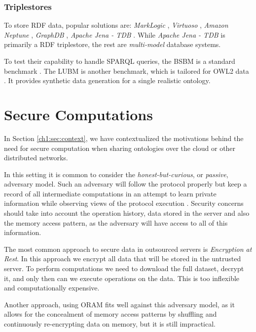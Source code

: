 \subsubsection{Triplestores} 

To store \gls{RDF} data, popular solutions are: \emph{MarkLogic} \autocite{MarkLogic2020-pb}, \emph{Virtuoso} \autocite{OpenLink_Software_undated-km}, \emph{Amazon Neptune} \autocite{Amazon_Web_Services_Inc_or_its_affiliates_undated-fj}, \emph{GraphDB} \autocite{Ontotext_undated-mj}, \emph{Apache Jena - TDB} \autocite{The_Apache_Software_Foundation_undated-mg}. While \emph{Apache Jena - TDB} is primarily a \gls{RDF} triplestore, the rest are \emph{multi-model} database systems. 

To test their capability to handle \gls{SPARQL} queries, the \gls{BSBM} is a standard benchmark \autocite{Chris_undated-hq}. The \gls{LUBM} is another benchmark, which is tailored for \gls{OWL2} data \autocite{Guo2005-ja}. It provides synthetic data generation for a single realistic ontology.

\section{Secure Computations}
\label{ch2:sec:secure-computations}
In Section \ref{ch1:sec:context}, we have contextualized the motivations behind the need for secure computation when sharing ontologies over the cloud or other distributed networks.

In this setting it is common to consider the \emph{honest-but-curious}, or \emph{passive}, adversary model. Such an adversary will follow the protocol properly but keep a record of all intermediate computations \autocite{Goldreich2001-sr} in an attempt to learn private information while observing views of the protocol execution \autocite{Evans2018-it}. Security concerns should take into account the operation history, data stored in the server and also the memory access pattern, as the adversary will have access to all of this information.

The most common approach to secure data in outsourced servers is \emph{Encryption at Rest}. In this approach we encrypt all data that will be stored in the untrusted server. To perform computations we need to download the full dataset, decrypt it, and only then can we execute operations on the data. This is too inflexible and computationally expensive. 

Another approach, using \gls{ORAM} \autocite{Goldreich1996-yb,} fits well against this adversary model, as it allows for the concealment of memory access patterns by shuffling and continuously re-encrypting data on memory, but it is still impractical.

